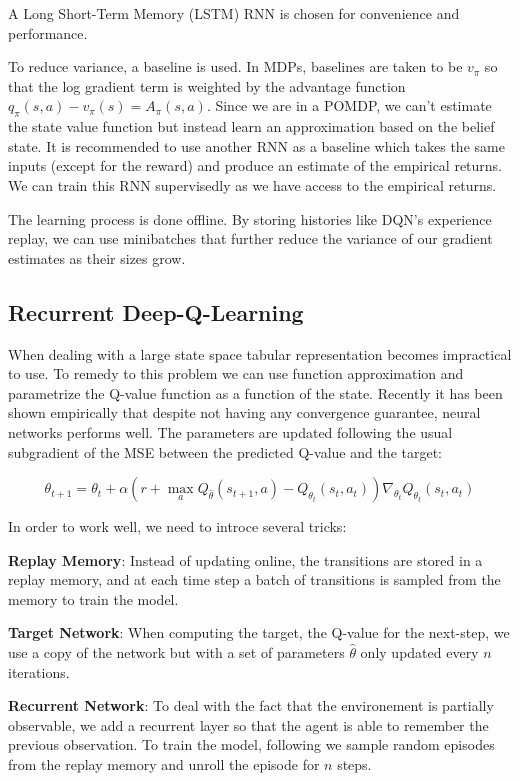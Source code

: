 \documentclass{article} %
\begin{document}
A Long Short-Term Memory\cite{hochreiter1997long} (LSTM) RNN is chosen for convenience and performance. 

To reduce variance, a baseline is used. In MDPs, baselines are taken to be $v_{\pi}$ so that the log gradient term is weighted by the advantage function $q_{\pi}(s,a) - v_{\pi}(s) = A_{\pi}(s,a)$. Since we are in a POMDP, we can't estimate the state value function but instead learn an approximation based on the belief state. It is recommended to use another RNN as a baseline which takes the same inputs (except for the reward) and produce an estimate of the empirical returns. We can train this RNN supervisedly as we have access to the empirical returns.

The learning process is done offline. By storing histories like DQN's experience replay, we can use minibatches that further reduce the variance of our gradient estimates as their sizes grow.

\subsection{Recurrent Deep-Q-Learning}
When dealing with a large state space tabular representation becomes impractical to use. To remedy to this problem we can use function approximation and parametrize the Q-value function as a function of the state. Recently it has been shown \cite{mnih2015human} empirically that despite not having any convergence guarantee, neural networks performs well.
The parameters are updated following the usual subgradient of the MSE between the predicted Q-value and the target:

$$\theta_{t+1} = \theta_t + \alpha(r+\max_a Q_{\hat{\theta}}(s_{t+1}, a) - Q_{\theta_t}(s_t, a_t))\nabla_{\theta_t}Q_{\theta_t}(s_t, a_t)$$

In order to work well, we need to introce several tricks:

\textbf{Replay Memory}: Instead of updating online, the transitions are stored in a replay memory, and at each time step a batch of transitions is sampled from the memory to train the model.

\textbf{Target Network}: When computing the target, the Q-value for the next-step, we use a copy of the network but with a set of parameters $\hat{\theta}$ only updated every $n$ iterations.


\textbf{Recurrent Network}: To deal with the fact that the environement is partially observable, we add a recurrent layer so that the agent is able to remember the previous observation. To train the model, following \cite{hausknecht2015deep} we sample random episodes from the replay memory and unroll the episode for $n$ steps.
\end{document}
